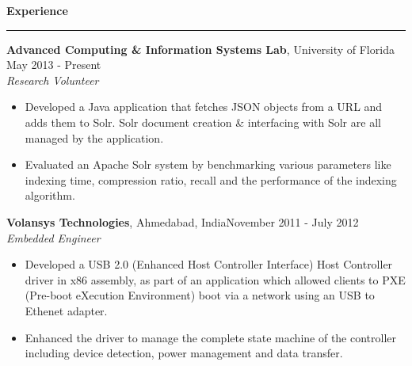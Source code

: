 \documentclass[10pt]{article}
\begin{document}
\textbf{Experience}
\smallskip
\hrule
{\bf Advanced Computing \& Information Systems Lab}, University of Florida \hfill May 2013 - Present\\
\textit{Research Volunteer}
\begin{itemize}
    \item Developed a Java application that fetches JSON objects from a URL and adds them to Solr. Solr document creation \& interfacing with Solr are all managed by the application. %
    \item Evaluated an Apache Solr system by benchmarking various parameters like indexing time, compression ratio, recall and the performance of the indexing algorithm.
\end{itemize}
{\bf Volansys Technologies}, Ahmedabad, India\hfill November 2011 - July 2012\\
\textit{Embedded Engineer}
\begin{itemize}
    \item Developed a USB 2.0 (Enhanced Host Controller Interface) Host Controller driver in x86 assembly, as part of an application which allowed clients to PXE (Pre-boot eXecution Environment) boot via a network using an USB to Ethenet adapter. 
    \item Enhanced the driver to manage the complete state machine of the controller including device detection, power management and data transfer. %
\end{itemize}
\end{document}
